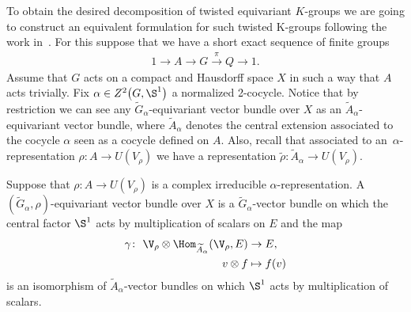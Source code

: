 To obtain the desired decomposition of twisted equivariant $K$-groups we are going to construct an equivalent
formulation for such twisted K-groups following the work in~\cite{GomezUribe}. For this suppose
that we have a short exact sequence of finite groups
\begin{gather*}
1\rightarrow A\rightarrow G\stackrel{\pi}{\rightarrow} Q\rightarrow 1.
\end{gather*}
Assume that $G$ acts on a compact and Hausdorff space $X$ in such a way that $A$ acts trivially.
Fix $\alpha\in Z^{2}\big(G,\S^{1}\big)$ a normalized 2-cocycle. Notice that by restriction we can
see any $\widetilde{G}_{\alpha}$-equivariant vector bundle over $X$ as an
$\widetilde{A}_{\alpha}$-equivariant vector bundle, where $\widetilde{A}_{\alpha}$ denotes the
central extension associated to the cocycle $\alpha$ seen as a cocycle defined on $A$.
Also, recall that associated to an~$\alpha$-representation $\rho\colon A \rightarrow U(V_{\rho})$ we have a representation
$\tilde{\rho}\colon \widetilde{A}_{\alpha} \rightarrow U(V_{\rho})$.

{\sloppy\begin{Def}
Suppose that $\rho\colon A \rightarrow U(V_{\rho})$ is a complex irreducible $\alpha$-representation.
A~$(\widetilde{G}_{\alpha}, \rho)$-equivariant vector bundle over $X$ is a
$\widetilde{G}_{\alpha}$-vector bundle on which the central factor $\S^{1}$ acts
by multiplication of scalars on $E$ and the map
\begin{align*}
\gamma\colon\ \V_{\rho}\otimes \Hom_{\widetilde{A}_{\alpha}}(\V_{\rho},E)&\rightarrow E,
\\
v\otimes f &\mapsto f(v)
\end{align*}
is an isomorphism of $\widetilde{A}_{\alpha}$-vector bundles on which $\S^{1}$ acts
by multiplication of scalars.
\end{Def}

}

